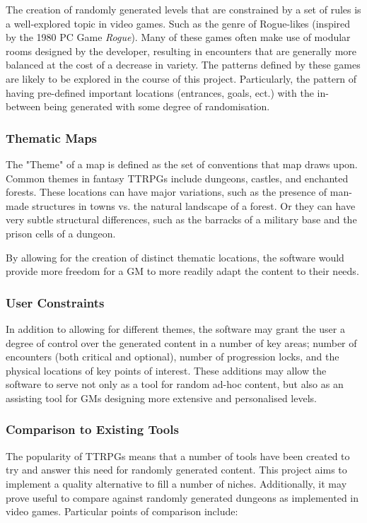 \documentclass{article}
\begin{document}
The creation of randomly generated levels that are constrained by a set of rules is a well-explored topic in video games. Such as the genre of Rogue-likes (inspired by the 1980 PC Game \textit{Rogue}). Many of these games often make use of modular rooms designed by the developer, resulting in encounters that are generally more balanced at the cost of a decrease in variety. The patterns defined by these games are likely to be explored in the course of this project. Particularly, the pattern of having pre-defined important locations (entrances, goals, ect.) with the in-between being generated with some degree of randomisation.

\subsubsection{Thematic Maps}
The "Theme" of a map is defined as the set of conventions that map draws upon. Common themes in fantasy TTRPGs include dungeons, castles, and enchanted forests.
These locations can have major variations, such as the presence of man-made structures in towns vs. the natural landscape of a forest. Or they can have very subtle structural differences, such as the barracks of a military base and the prison cells of a dungeon.

By allowing for the creation of distinct thematic locations, the software would provide more freedom for a GM to more readily adapt the content to their needs. 

\subsubsection{User Constraints}
In addition to allowing for different themes, the software may grant the user a degree of control over the generated content in a number of key areas; number of encounters (both critical and optional), number of progression locks, and the physical locations of key points of interest. These additions may allow the software to serve not only as a tool for random ad-hoc content, but also as an assisting tool for GMs designing more extensive and personalised levels.

\subsubsection{Comparison to Existing Tools}
The popularity of TTRPGs means that a number of tools have been created to try and answer this need for randomly generated content. This project aims to implement a quality alternative to fill a number of niches. Additionally, it may prove useful to compare against randomly generated dungeons as implemented in video games. Particular points of comparison include:
\end{document}
